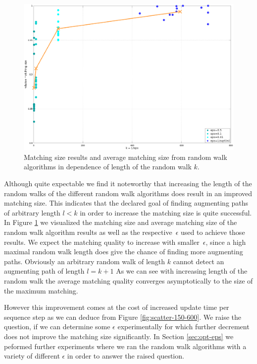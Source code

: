 \documentclass{article}      %
\begin{document}
\begin{figure}
	\centering
	\includegraphics[width=\textwidth]{img/exp_150k_600k_eps_quality.png}
	\caption{Matching size results and average matching size from random walk algorithms in dependence of length of the random walk $k$.}
	\label{fig:eps-quality}
\end{figure}

\bigskip \noindent
Although quite expectable we find it noteworthy that increasing the length of the random walks of the different random walk algorithms does result in an improved matching size. This indicates that the declared goal of finding augmenting paths of arbitrary length $l < k$ in order to increase the matching size is quite successful. In Figure \ref{fig:eps-quality} we visualized the matching size and average matching size of the random walk algorithm results as well as the respective~$\epsilon$ used to achieve those results. We expect the matching quality to increase with smaller~$\epsilon$, since a high maximal random walk length does give the chance of finding more augmenting paths. Obviously an arbitrary random walk of length $k$ cannot detect an augmenting path of length $l = k+1$ As we can see with increasing length of the random walk the average matching quality converges asymptotically to the size of the maximum matching.

However this improvement comes at the cost of increased update time per sequence step as we can deduce from Figure \ref{fig:scatter-150-600}. We raise the question, if we can determine some $\epsilon$ experimentally for which further decrement does not improve the matching size significantly. In Section \ref{sec:opt-eps} we peformed further experiments where we ran the random walk algorithms with a variety of different $\epsilon$ in order to answer the raised question.
\end{document}
